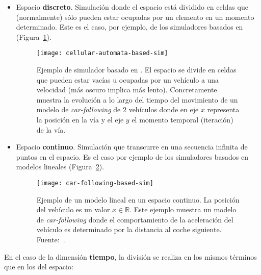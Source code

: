 \begin{itemize}
	\item Espacio \textbf{discreto}. Simulación donde el espacio está dividido en celdas que (normalmente) sólo pueden estar ocupadas por un elemento en un momento determinado. Este es el caso, por ejemplo, de los simuladores basados en  (Figura~\ref{fig:cellular-automata-based-sim}).

	\begin{figure}
		\centering
		\texttt{[image: cellular-automata-based-sim]}
		\caption[Ejemplo de simulador basado en ]{Ejemplo de simulador basado en . El espacio se divide en celdas que pueden estar vacías u ocupadas por un vehículo a una velocidad (más oscuro implica más lento). Concretamente muestra la evolución a lo largo del tiempo del movimiento de un modelo de \textit{\gls{car-following}} de $2$ vehículos donde en eje $x$ representa la posición en la vía y el eje $y$ el momento temporal (iteración) de la vía.}
		\label{fig:cellular-automata-based-sim}
	\end{figure}

	\item Espacio \textbf{continuo}. Simulación que transcurre en una secuencia infinita de puntos en el espacio. Es el caso por ejemplo de los simuladores basados en modelos lineales (Figura~\ref{fig:car-following-based-sim}).
	
	
	\begin{figure}
		\centering
		\texttt{[image: car-following-based-sim]}
		\caption[Ejemplo de modelo lineal en un espacio continuo]{Ejemplo de un modelo lineal en un espacio continuo. La posición del vehículo es un valor $x \in \mathbb{R}$. Este ejemplo muestra un modelo de \textit{\gls{car-following}} donde el comportamiento de la aceleración del vehículo es determinado por la distancia al coche siguiente. Fuente:~\cite{Tordeux2011}.}
		\label{fig:car-following-based-sim}
	\end{figure}
	
\end{itemize}

En el caso de la dimensión \textbf{tiempo}, la división se realiza en los mismos términos que en los del espacio:

